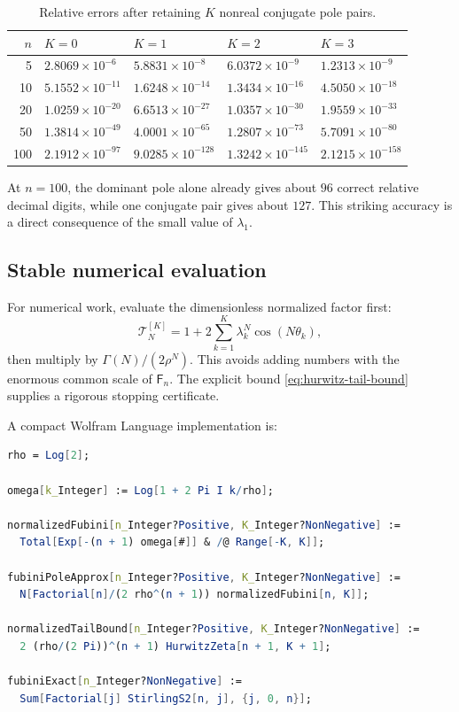 \documentclass[11pt,oneside]{article}
\numberwithin{equation}{section}
\newcommand{\Fub}{\mathsf F}
\begin{document}
\begin{table}[ht]
\centering
\small
\caption{Relative errors after retaining \(K\) nonreal conjugate pole pairs.}
\label{tab:errors}
\begin{tabular}{@{}rllll@{}}
\toprule
\(n\) & \(K=0\) & \(K=1\) & \(K=2\) & \(K=3\)\\
\midrule
5   & \(2.8069\times10^{-6}\)  & \(5.8831\times10^{-8}\)  & \(6.0372\times10^{-9}\)  & \(1.2313\times10^{-9}\)\\
10  & \(5.1552\times10^{-11}\) & \(1.6248\times10^{-14}\) & \(1.3434\times10^{-16}\) & \(4.5050\times10^{-18}\)\\
20  & \(1.0259\times10^{-20}\) & \(6.6513\times10^{-27}\) & \(1.0357\times10^{-30}\) & \(1.9559\times10^{-33}\)\\
50  & \(1.3814\times10^{-49}\) & \(4.0001\times10^{-65}\) & \(1.2807\times10^{-73}\) & \(5.7091\times10^{-80}\)\\
100 & \(2.1912\times10^{-97}\) & \(9.0285\times10^{-128}\)& \(1.3242\times10^{-145}\)& \(2.1215\times10^{-158}\)\\
\bottomrule
\end{tabular}
\end{table}

At \(n=100\), the dominant pole alone already gives about \(96\) correct relative decimal digits, while one conjugate pair gives about \(127\).  This striking accuracy is a direct consequence of the small value of \(\lambda_1\).

\subsection{Stable numerical evaluation}

For numerical work, evaluate the dimensionless normalized factor first:
\begin{equation}
 \mathscr T_N^{[K]}
 =1+2\sum_{k=1}^{K}\lambda_k^N\cos(N\theta_k),
 \label{eq:stable-normalized-sum}
\end{equation}
then multiply by \(\Gamma(N)/(2\rho^N)\).  This avoids adding numbers with the enormous common scale of \(\Fub_n\).  The explicit bound \cref{eq:hurwitz-tail-bound} supplies a rigorous stopping certificate.

A compact Wolfram Language implementation is:
\begin{lstlisting}[language=Mathematica,caption={Pole-lattice approximation with a rigorous normalized tail bound.}]
rho = Log[2];

omega[k_Integer] := Log[1 + 2 Pi I k/rho];

normalizedFubini[n_Integer?Positive, K_Integer?NonNegative] :=
  Total[Exp[-(n + 1) omega[#]] & /@ Range[-K, K]];

fubiniPoleApprox[n_Integer?Positive, K_Integer?NonNegative] :=
  N[Factorial[n]/(2 rho^(n + 1)) normalizedFubini[n, K]];

normalizedTailBound[n_Integer?Positive, K_Integer?NonNegative] :=
  2 (rho/(2 Pi))^(n + 1) HurwitzZeta[n + 1, K + 1];

fubiniExact[n_Integer?NonNegative] :=
  Sum[Factorial[j] StirlingS2[n, j], {j, 0, n}];
\end{lstlisting}
\end{document}
